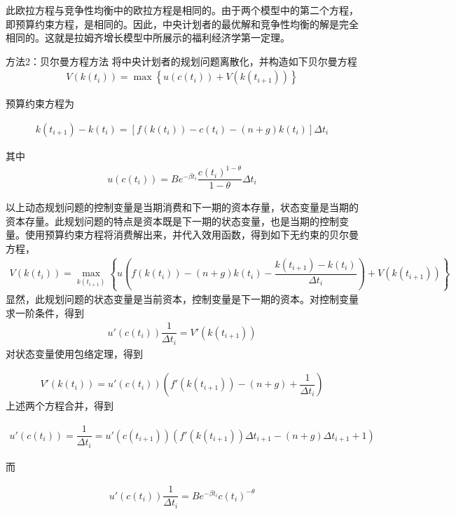 此欧拉方程与竞争性均衡中的欧拉方程是相同的。由于两个模型中的第二个方程，即预算约束方程，是相同的。因此，中央计划者的最优解和竞争性均衡的解是完全相同的。这就是拉姆齐增长模型中所展示的福利经济学第一定理。

方法2：贝尔曼方程方法
将中央计划者的规划问题离散化，并构造如下贝尔曼方程
\begin{gather}
	V(k(t_i))=\max
	\left\{
	u(c(t_i))+V(k(t_{i+1}))
	\right\}
\end{gather}

预算约束方程为

\begin{gather}
  k(t_{i+1})-k(t_i)=
  \left[
  f(k(t_i))-c(t_i)-(n+g)k(t_i)
  \right]\Delta t_i
\end{gather}

其中
\begin{gather}
	u(c(t_i))=Be^{-\beta t_i}\dfrac{c(t_i)^{1-\theta}}{1-\theta}\Delta t_i
\end{gather}

以上动态规划问题的控制变量是当期消费和下一期的资本存量，状态变量是当期的资本存量。此规划问题的特点是资本既是下一期的状态变量，也是当期的控制变量。使用预算约束方程将消费解出来，并代入效用函数，得到如下无约束的贝尔曼方程，
\begin{gather}
	V(k(t_i))=\max_{k(t_{i+1})}
	\left\{
	u\left(
	f(k(t_i))-(n+g)k(t_i)-\dfrac{k(t_{i+1})-k(t_i)}
	{\Delta t_i}
	\right)+V(k(t_{i+1}))
	\right\}
\end{gather}
显然，此规划问题的状态变量是当前资本，控制变量是下一期的资本。对控制变量求一阶条件，得到
\begin{gather}
	u'(c(t_i))\dfrac{1}{\Delta t_i}=V'(k(t_{i+1}))
\end{gather}
对状态变量使用包络定理，得到

\begin{gather}
    V'(k(t_{i}))=u'(c(t_i))
    \left(
    f'(k(t_{i+1}))-(n+g)+\dfrac{1}{\Delta t_i}
    \right)
\end{gather}
上述两个方程合并，得到

\begin{gather}
	u'(c(t_i))=\dfrac{1}{\Delta t_i}=
	u'(c(t_{i+1}))
	\left(
	f'(k(t_{i+1}))\Delta t_{i+1}-(n+g)\Delta t_{i+1}+1
	\right)
\end{gather}

而

\begin{gather}
	u'(c(t_i))\dfrac{1}{\Delta t_i}=
	B e^{-\beta t_i}c(t_i)^{-\theta}
\end{gather}

